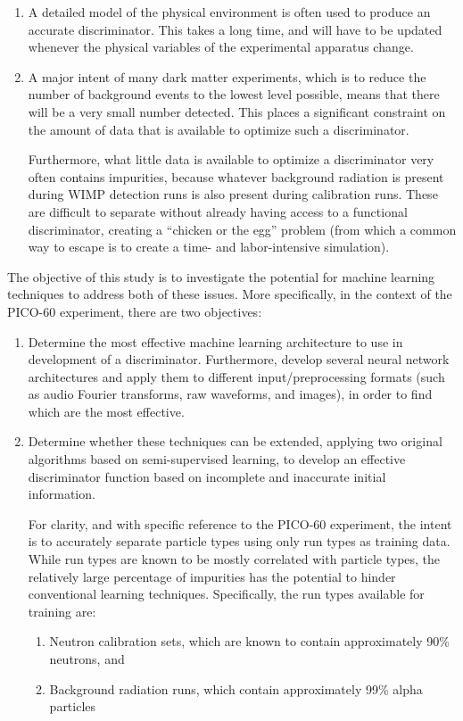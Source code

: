 \documentclass[10pt]{article}
\begin{document}
\begin{enumerate}
    \item A detailed model of the physical environment is often used to produce an accurate discriminator. This takes a long time, and will have to be updated whenever the physical variables of the experimental apparatus change.

    \item A major intent of many dark matter experiments, which is to reduce the number of background events to the lowest level possible, means that there will be a very small number detected. This places a significant constraint on the amount of data that is available to optimize such a discriminator.

    Furthermore, what little data is available to optimize a discriminator very often contains impurities, because whatever background radiation is present during WIMP detection runs is also present during calibration runs. These are difficult to separate without already having access to a functional discriminator, creating a ``chicken or the egg'' problem (from which a common way to escape is to create a time- and labor-intensive simulation).
\end{enumerate}

The objective of this study is to investigate the potential for machine learning techniques to address both of these issues. More specifically, in the context of the PICO-60 experiment, there are two objectives:

\begin{enumerate}
    \item Determine the most effective machine learning architecture to use in development of a discriminator. Furthermore, develop several neural network architectures and apply them to different input/preprocessing formats (such as audio Fourier transforms, raw waveforms, and images), in order to find which are the most effective.

    \item Determine whether these techniques can be extended, applying two original algorithms based on semi-supervised learning, to develop an effective discriminator function based on incomplete and inaccurate initial information.
    
    For clarity, and with specific reference to the PICO-60 experiment, the intent is to accurately separate particle types using only run types as training data. While run types are known to be mostly correlated with particle types, the relatively large percentage of impurities has the potential to hinder conventional learning techniques. Specifically, the run types available for training are:

    \begin{enumerate}
        \item Neutron calibration sets, which are known to contain approximately 90\% neutrons, and
        \item Background radiation runs, which contain approximately 99\% alpha particles
    \end{enumerate}
\end{enumerate}
\end{document}
